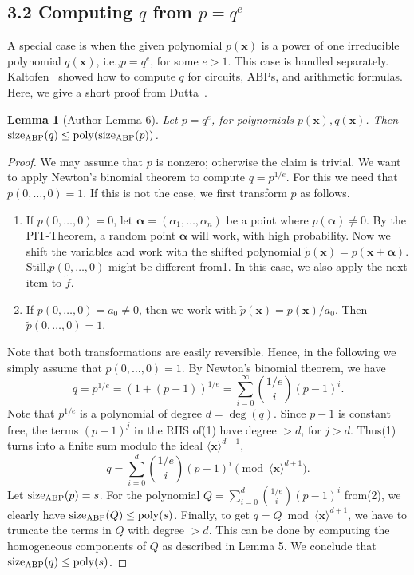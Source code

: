 \documentclass[10pt,a4paper]{article}
\newtheorem{ntlemma}[nttheorem]{Lemma}
\newcommand{\sz}{\operatorname{size}_{\rm ABP}}
\begin{document}
\subsection*{3.2 Computing $q$ from $p=q^e$}
A special case is when the given polynomial $p(\mathbf x)$ is a power of one irreducible polynomial $q(\mathbf x)$, i.e.,$p=q^e$, for some $e>1$. This case is handled separately. Kaltofen~\cite{ref10} showed how to compute $q$ for circuits, ABPs, and arithmetic formulas. Here, we give a short proof from Dutta~\cite{ref5}.
\begin{ntlemma}[Author Lemma 6]
Let $p=q^e$, for polynomials $p(\mathbf x),q(\mathbf x)$. Then $\sz(q)\leq\operatorname{poly}(\sz(p))$.
\end{ntlemma}
\begin{proof}
We may assume that $p$ is nonzero; otherwise the claim is trivial. We want to apply Newton's binomial theorem to compute $q=p^{1/e}$. For this we need that $p(0,\ldots,0)=1$. If this is not the case, we first transform $p$ as follows.
\begin{enumerate}\item If $p(0,\ldots,0)=0$, let $\boldsymbol\alpha=(\alpha_1,\ldots,\alpha_n)$ be a point where $p(\boldsymbol\alpha)\ne0$. By the PIT-Theorem, a random point $\boldsymbol\alpha$ will work, with high probability. Now we shift the variables and work with the shifted polynomial $\widetilde p(\mathbf x)=p(\mathbf x+\boldsymbol\alpha)$. Still,$\widetilde p(0,\ldots,0)$ might be different from1. In this case, we also apply the next item to $\widetilde f$.\item If $p(0,\ldots,0)=a_0\ne0$, then we work with $\widetilde p(\mathbf x)=p(\mathbf x)/a_0$. Then $\widetilde p(0,\ldots,0)=1$.\end{enumerate}
Note that both transformations are easily reversible. Hence, in the following we simply assume that $p(0,\ldots,0)=1$.
By Newton's binomial theorem, we have
\begin{equation}q=p^{1/e}=(1+(p-1))^{1/e}=\sum_{i=0}^\infty\binom{1/e}i(p-1)^i.\tag{1}\end{equation}
Note that $p^{1/e}$ is a polynomial of degree $d=\deg(q)$. Since $p-1$ is constant free, the terms $(p-1)^j$ in the RHS of(1) have degree $>d$, for $j>d$. Thus(1) turns into a finite sum modulo the ideal $\langle\mathbf x\rangle^{d+1}$,
\begin{equation}q=\sum_{i=0}^d\binom{1/e}i(p-1)^i\pmod{\langle\mathbf x\rangle^{d+1}}.\tag{2}\end{equation}
Let $\sz(p)=s$. For the polynomial $Q=\sum_{i=0}^d\binom{1/e}i(p-1)^i$ from(2), we clearly have $\sz(Q)\leq\operatorname{poly}(s)$. Finally, to get $q=Q\bmod\langle\mathbf x\rangle^{d+1}$, we have to truncate the terms in $Q$ with degree $>d$. This can be done by computing the homogeneous components of $Q$ as described in Lemma 5. We conclude that $\sz(q)\leq\operatorname{poly}(s)$.
\end{proof}
\end{document}
